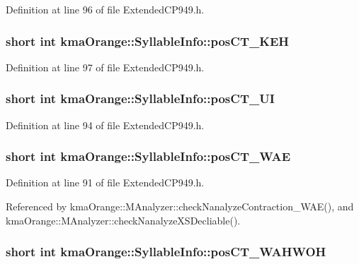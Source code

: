 Definition at line 96 of file ExtendedCP949.h.\hypertarget{structkmaOrange_1_1SyllableInfo_3a286e19dd3d592f3621540f79c6de17}{
\subsubsection[{posCT\_\-KEH}]{\setlength{\rightskip}{0pt plus 5cm}short int {\bf kmaOrange::SyllableInfo::posCT\_\-KEH}}}
\label{structkmaOrange_1_1SyllableInfo_3a286e19dd3d592f3621540f79c6de17}




Definition at line 97 of file ExtendedCP949.h.\hypertarget{structkmaOrange_1_1SyllableInfo_adab0a715632279a137ee6ffbac0b48c}{
\subsubsection[{posCT\_\-UI}]{\setlength{\rightskip}{0pt plus 5cm}short int {\bf kmaOrange::SyllableInfo::posCT\_\-UI}}}
\label{structkmaOrange_1_1SyllableInfo_adab0a715632279a137ee6ffbac0b48c}




Definition at line 94 of file ExtendedCP949.h.\hypertarget{structkmaOrange_1_1SyllableInfo_508e4e61d5debce751b90fe6547b12c0}{
\subsubsection[{posCT\_\-WAE}]{\setlength{\rightskip}{0pt plus 5cm}short int {\bf kmaOrange::SyllableInfo::posCT\_\-WAE}}}
\label{structkmaOrange_1_1SyllableInfo_508e4e61d5debce751b90fe6547b12c0}




Definition at line 91 of file ExtendedCP949.h.

Referenced by kmaOrange::MAnalyzer::checkNanalyzeContraction\_\-WAE(), and kmaOrange::MAnalyzer::checkNanalyzeXSDecliable().\hypertarget{structkmaOrange_1_1SyllableInfo_b55818f2b1df66a4ddb0439d94a3204e}{
\subsubsection[{posCT\_\-WAHWOH}]{\setlength{\rightskip}{0pt plus 5cm}short int {\bf kmaOrange::SyllableInfo::posCT\_\-WAHWOH}}}
\label{structkmaOrange_1_1SyllableInfo_b55818f2b1df66a4ddb0439d94a3204e}





